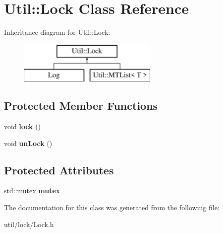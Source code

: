 \hypertarget{class_util_1_1_lock}{}\section{Util\+:\+:Lock Class Reference}
\label{class_util_1_1_lock}
Inheritance diagram for Util\+:\+:Lock\+:\begin{figure}[H]
\begin{center}
\leavevmode
\includegraphics[height=2.000000cm]{class_util_1_1_lock}
\end{center}
\end{figure}
\subsection*{Protected Member Functions}
\begin{DoxyCompactItemize}
\item 
\mbox{\label{class_util_1_1_lock_a2d72c766879141194ba56eded4c5f393}} 
void {\bfseries lock} ()
\item 
\mbox{\label{class_util_1_1_lock_a937cc82b6f7acf16ecbdca9c5bc751f4}} 
void {\bfseries un\+Lock} ()
\end{DoxyCompactItemize}
\subsection*{Protected Attributes}
\begin{DoxyCompactItemize}
\item 
\mbox{\label{class_util_1_1_lock_a6ab60541566026a346de5b4bd59f3e66}} 
std\+::mutex {\bfseries mutex}
\end{DoxyCompactItemize}


The documentation for this class was generated from the following file\+:\begin{DoxyCompactItemize}
\item 
util/lock/Lock.\+h\end{DoxyCompactItemize}
